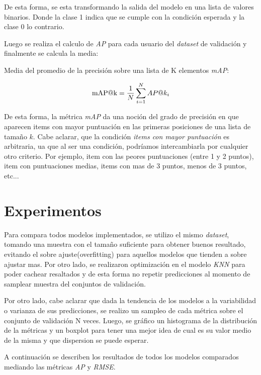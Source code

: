 \documentclass[11pt,a4paper,twoside]{thesis}
\begin{document}
{De esta forma, se esta transformando la salida del modelo en una lista de
valores binarios. Donde la clase 1 indica que se cumple con la condición
esperada y la clase 0 lo contrario.

Luego se realiza el calculo de \textit{AP\makeatletter@k} para cada usuario del
\textit{dataset} de validación y finalmente se calcula la media:

\begin{description}
	\item[Media del promedio de la precisión sobre una lista de K elementos
	\textit{mAP\makeatletter@k}:]
\end{description}
\begin{equation}
	\operatorname{mAP\makeatletter@k}=\frac{1}{N} \sum_{i=1}^N AP\makeatletter@k_i
\end{equation}

De esta forma, la métrica \textit{mAP\makeatletter@k} da una noción del grado
de precisión en que aparecen items con mayor puntuación en las primeras
posiciones de una lista de tamaño $k$. Cabe aclarar, que la condición
\textit{items con mayor puntuación} es arbitraria, ua que al ser una condición,
podríamos intercambiarla por cualquier otro criterio. Por ejemplo, item con las
peores puntuaciones (entre 1 y 2 puntos), item con puntuaciones medias, items
con mas de 3 puntos, menos de 3 puntos, etc...

\chapter{Experimentos}

Para compara todos modelos implementados, se utilizo el mismo \textit{dataset},
tomando una muestra con el tamaño suficiente para obtener buenos resultado,
evitando el sobre ajuste(overfitting) para aquellos modelos que tienden a sobre
ajustar mas. Por otro lado, se realizaron optimización en el modelo
\textit{KNN} para poder cachear resaltados y de esta forma no repetir
predicciones al momento de samplear muestra del conjuntos de validación.

Por otro lado, cabe aclarar que dada la tendencia de los modelos a la
variabilidad o varianza de sus predicciones, se realizo un sampleo de cada
métrica sobre el conjunto de validación N veces. Luego, se gráfico un
histograma de la distribución de la métricas y un boxplot para tener una mejor
idea de cual es su valor medio de la misma y que dispersion se puede esperar.

A continuación se describen los resultados de todos los modelos comparados
mediando las métricas \textit{AP\makeatletter@k} y \textit{RMSE}.

}
\end{document}
